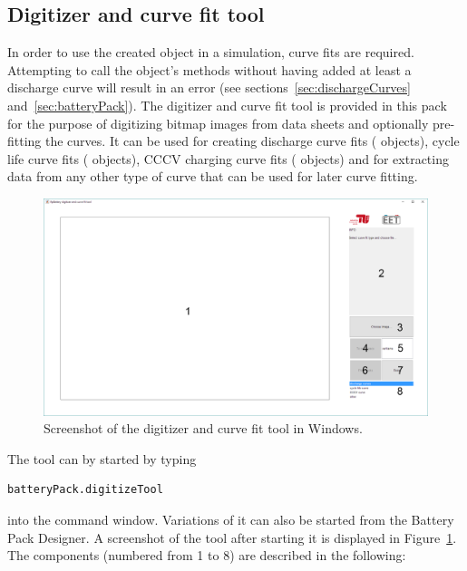 \subsection{Digitizer and curve fit tool}
\label{sec:digitizeTool}
In order to use the created  object in a simulation, curve fits are required. Attempting to call the object's methods without having added at least a discharge curve will result in an error (see sections~\ref{sec:dischargeCurves} and~\ref{sec:batteryPack}). The digitizer and curve fit tool is provided in this pack for the purpose of digitizing bitmap images from data sheets and optionally pre-fitting the curves. It can be used for creating discharge curve fits ( objects), cycle life curve fits ( objects), CCCV charging curve fits ( objects) and for extracting data from any other type of curve that can be used for later curve fitting.
\begin{figure}[b!]
	\captionsetup{type=figure}
	\centering
	\includegraphics[width=\textwidth]{digitizeTool01.png}
	\caption[Screenshot of the digitizer and curve fit tool in Windows]{Screenshot of the digitizer and curve fit tool in Windows.}
	\label{fig:digitizeTool01}
\end{figure}
The tool can by started by typing
\begin{lstlisting}
batteryPack.digitizeTool
\end{lstlisting}
into the command window. Variations of it can also be started from the Battery Pack Designer. A screenshot of the tool after starting it is displayed in Figure~\ref{fig:digitizeTool01}. The components (numbered from 1 to 8) are described in the following:
